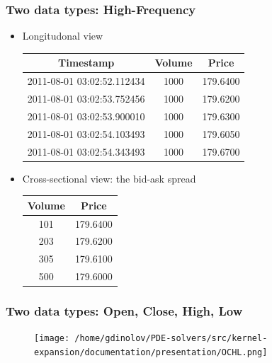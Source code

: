 \documentclass{beamer}
\begin{document}
\begin{frame}
\frametitle{Two data types: High-Frequency}

\begin{itemize}
  \item Longitudonal view
\begin{table}
\begin{tabular}{|c|c|c|}
  Timestamp & Volume& Price \\
  \hline
  2011-08-01 03:02:52.112434 & 1000 & 179.6400 \\
  \hline
  2011-08-01 03:02:53.752456 & 1000 & 179.6200 \\
  \hline
  2011-08-01 03:02:53.900010 & 1000 & 179.6300 \\
  \hline
  2011-08-01 03:02:54.103493 & 1000 & 179.6050 \\
  \hline
  2011-08-01 03:02:54.343493 & 1000 & 179.6700 \\
\end{tabular}
\end{table}

\item Cross-sectional view: the bid-ask spread
  \begin{table}
  \begin{tabular}{c|c}
    Volume & Price \\
    \hline \hline
    101 & 179.6400 \\
    203 & 179.6200 \\
    \hline
    305 & 179.6100 \\
    500 & 179.6000 \\
  \end{tabular}
  \end{table}
\end{itemize}
\end{frame}


\begin{frame}
\frametitle{Two data types: Open, Close, High, Low}

\begin{figure}
  \texttt{[image: /home/gdinolov/PDE-solvers/src/kernel-expansion/documentation/presentation/OCHL.png]}
\end{figure}

\end{frame}

\end{document}
